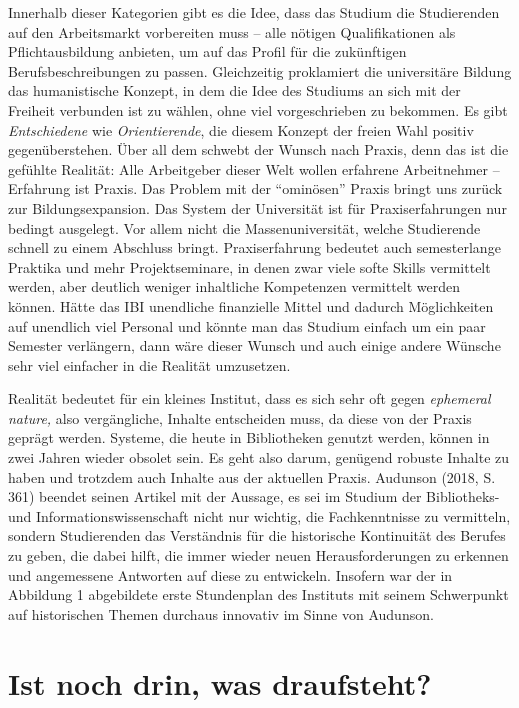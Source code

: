 \documentclass[a4paper,
fontsize=11pt,
oneside,
numbers=noperiodatend,
parskip=half-,
bibliography=totoc,
final
]{scrartcl}
\begin{document}
Innerhalb dieser Kategorien gibt es die Idee, dass das Studium die
Studierenden auf den Arbeitsmarkt vorbereiten muss -- alle nötigen
Qualifikationen als Pflichtausbildung anbieten, um auf das Profil für
die zukünftigen Berufsbeschreibungen zu passen. Gleichzeitig proklamiert
die universitäre Bildung das humanistische Konzept, in dem die Idee des
Studiums an sich mit der Freiheit verbunden ist zu wählen, ohne viel
vorgeschrieben zu bekommen. Es gibt \emph{Entschiedene} wie
\emph{Orientierende}, die diesem Konzept der freien Wahl positiv
gegenüberstehen. Über all dem schwebt der Wunsch nach Praxis, denn das
ist die gefühlte Realität: Alle Arbeitgeber dieser Welt wollen erfahrene
Arbeitnehmer -- Erfahrung ist Praxis. Das Problem mit der
\enquote{ominösen} Praxis bringt uns zurück zur Bildungsexpansion. Das
System der Universität ist für Praxiserfahrungen nur bedingt ausgelegt.
Vor allem nicht die Massenuniversität, welche Studierende schnell zu
einem Abschluss bringt. Praxiserfahrung bedeutet auch semesterlange
Praktika und mehr Projektseminare, in denen zwar viele softe Skills
vermittelt werden, aber deutlich weniger inhaltliche Kompetenzen
vermittelt werden können. Hätte das IBI unendliche finanzielle Mittel
und dadurch Möglichkeiten auf unendlich viel Personal und könnte man das
Studium einfach um ein paar Semester verlängern, dann wäre dieser Wunsch
und auch einige andere Wünsche sehr viel einfacher in die Realität
umzusetzen.

Realität bedeutet für ein kleines Institut, dass es sich sehr oft gegen
\emph{ephemeral nature,} also vergängliche, Inhalte entscheiden muss, da
diese von der Praxis geprägt werden. Systeme, die heute in Bibliotheken
genutzt werden, können in zwei Jahren wieder obsolet sein. Es geht also
darum, genügend robuste Inhalte zu haben und trotzdem auch Inhalte aus
der aktuellen Praxis. Audunson (2018, S. 361) beendet seinen Artikel mit
der Aussage, es sei im Studium der Bibliotheks- und
Informationswissenschaft nicht nur wichtig, die Fachkenntnisse zu
vermitteln, sondern Studierenden das Verständnis für die historische
Kontinuität des Berufes zu geben, die dabei hilft, die immer wieder
neuen Herausforderungen zu erkennen und angemessene Antworten auf diese
zu entwickeln. Insofern war der in Abbildung 1 abgebildete erste
Stundenplan des Instituts mit seinem Schwerpunkt auf historischen Themen
durchaus innovativ im Sinne von Audunson.

\hypertarget{ist-noch-drin-was-draufsteht}{%
\section{Ist noch drin, was
draufsteht?}\label{ist-noch-drin-was-draufsteht}}
\end{document}
